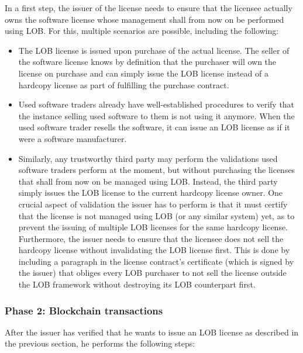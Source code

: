 \documentclass[a4paper]{article}
\begin{document}
In a first step, the issuer of the license needs to ensure that the licensee actually owns the software license whose management shall from now on be performed using LOB. For this, multiple scenarios are possible, including the following:
\begin{itemize}
  \item The LOB license is issued upon purchase of the actual license. The seller of the software license knows by definition that the purchaser will own the license on purchase and can simply issue the LOB license instead of a hardcopy license as part of fulfilling the purchase contract.

  \item Used software traders already have well-established procedures to verify that the instance selling used software to them is not using it anymore. When the used software trader resells the software, it can issue an LOB license as if it were a software manufacturer.

  \item Similarly, any trustworthy third party may perform the validations used software traders perform at the moment, but without purchasing the licenses that shall from now on be managed using LOB. Instead, the third party simply issues the LOB license to the current hardcopy license owner. One crucial aspect of validation the issuer has to perform is that it must certify that the license is not managed using LOB (or any similar system) yet, as to prevent the issuing of multiple LOB licenses for the same hardcopy license. Furthermore, the issuer needs to ensure that the licensee does not sell the hardcopy license without invalidating the LOB license first. This is done by including a paragraph in the license contract's certificate (which is signed by the issuer) that obliges every LOB purchaser to not sell the license outside the LOB framework without destroying its LOB counterpart first.
\end{itemize}

\subsubsection{Phase 2: Blockchain transactions}

After the issuer has verified that he wants to issue an LOB license as described in the previous section, he performs the following steps:
\end{document}
